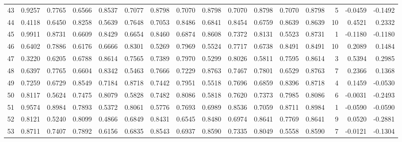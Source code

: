 \begin{tabular}{lrrrrrrrrrrrrrrr}
43  &      0.9257 &  0.7765 &  0.6566 &  0.8537 &  0.7077 &  0.8798 &  0.7070 &  0.8798 &  0.7070 &  0.8798 &   0.7070 &     0.8798 &      5 &                   -0.0459 &                    -0.1492 \\
44  &      0.4118 &  0.6450 &  0.8258 &  0.5639 &  0.7648 &  0.7053 &  0.8486 &  0.6841 &  0.8454 &  0.6759 &   0.8639 &     0.8639 &     10 &                    0.4521 &                     0.2332 \\
45  &      0.9911 &  0.8731 &  0.6609 &  0.8429 &  0.6654 &  0.8460 &  0.6874 &  0.8608 &  0.7372 &  0.8131 &   0.5523 &     0.8731 &      1 &                   -0.1180 &                    -0.1180 \\
46  &      0.6402 &  0.7886 &  0.6176 &  0.6666 &  0.8301 &  0.5269 &  0.7969 &  0.5524 &  0.7717 &  0.6738 &   0.8491 &     0.8491 &     10 &                    0.2089 &                     0.1484 \\
47  &      0.3220 &  0.6205 &  0.6788 &  0.8614 &  0.7565 &  0.7389 &  0.7970 &  0.5299 &  0.8026 &  0.5811 &   0.7595 &     0.8614 &      3 &                    0.5394 &                     0.2985 \\
48  &      0.6397 &  0.7765 &  0.6604 &  0.8342 &  0.5463 &  0.7666 &  0.7229 &  0.8763 &  0.7467 &  0.7801 &   0.6529 &     0.8763 &      7 &                    0.2366 &                     0.1368 \\
49  &      0.7259 &  0.6729 &  0.8549 &  0.7184 &  0.8718 &  0.7442 &  0.7951 &  0.5518 &  0.7696 &  0.6859 &   0.8396 &     0.8718 &      4 &                    0.1459 &                    -0.0530 \\
50  &      0.8117 &  0.5624 &  0.7475 &  0.8079 &  0.5828 &  0.7482 &  0.8086 &  0.5818 &  0.7620 &  0.7373 &   0.7985 &     0.8086 &      6 &                   -0.0031 &                    -0.2493 \\
51  &      0.9574 &  0.8984 &  0.7893 &  0.5372 &  0.8061 &  0.5776 &  0.7693 &  0.6989 &  0.8536 &  0.7059 &   0.8711 &     0.8984 &      1 &                   -0.0590 &                    -0.0590 \\
52  &      0.8121 &  0.5240 &  0.8099 &  0.4866 &  0.6849 &  0.8431 &  0.6545 &  0.8480 &  0.6974 &  0.8641 &   0.7769 &     0.8641 &      9 &                    0.0520 &                    -0.2881 \\
53  &      0.8711 &  0.7407 &  0.7892 &  0.6156 &  0.6835 &  0.8543 &  0.6937 &  0.8590 &  0.7335 &  0.8049 &   0.5558 &     0.8590 &      7 &                   -0.0121 &                    -0.1304 \\

\end{tabular}
